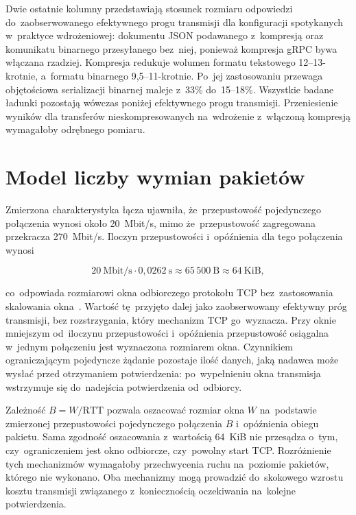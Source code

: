 Dwie ostatnie kolumny przedstawiają stosunek rozmiaru odpowiedzi do~zaobserwowanego efektywnego progu transmisji dla konfiguracji spotykanych w~praktyce wdrożeniowej: dokumentu JSON podawanego z~kompresją oraz komunikatu binarnego przesyłanego bez~niej, ponieważ kompresja gRPC bywa włączana rzadziej. Kompresja redukuje wolumen formatu tekstowego 12--13-krotnie, a~formatu binarnego 9,5--11-krotnie. Po~jej zastosowaniu przewaga objętościowa serializacji binarnej maleje z~33\% do~15--18\%. Wszystkie badane ładunki pozostają wówczas poniżej efektywnego progu transmisji. Przeniesienie wyników dla transferów nieskompresowanych na~wdrożenie z~włączoną kompresją wymagałoby odrębnego pomiaru.

\section{Model liczby wymian pakietów}
\label{sec:ModelOkna}

Zmierzona charakterystyka łącza ujawniła, że~przepustowość pojedynczego połączenia wynosi około 20~Mbit/s, mimo że~przepustowość zagregowana przekracza 270~Mbit/s. Iloczyn przepustowości i~opóźnienia dla tego połączenia wynosi

\begin{equation}
20~\mathrm{Mbit/s} \cdot 0{,}0262~\mathrm{s} \approx 65\,500~\mathrm{B} \approx 64~\mathrm{KiB},
\label{eq:BDP}
\end{equation}

co~odpowiada rozmiarowi okna odbiorczego protokołu TCP bez~zastosowania skalowania okna~\cite{bib:RFC9293}. Wartość tę~przyjęto dalej jako zaobserwowany efektywny próg transmisji, bez rozstrzygania, który mechanizm TCP go~wyznacza. Przy oknie mniejszym od~iloczynu przepustowości i~opóźnienia przepustowość osiągalna w~jednym połączeniu jest wyznaczona rozmiarem okna. Czynnikiem ograniczającym pojedyncze żądanie pozostaje ilość danych, jaką nadawca może wysłać przed otrzymaniem potwierdzenia: po~wypełnieniu okna transmisja wstrzymuje się do~nadejścia potwierdzenia od~odbiorcy.

Zależność $B = W / \mathrm{RTT}$ pozwala oszacować rozmiar okna $W$ na~podstawie zmierzonej przepustowości pojedynczego połączenia $B$ i~opóźnienia obiegu pakietu. Sama zgodność oszacowania z~wartością 64~KiB nie przesądza o~tym, czy~ograniczeniem jest okno odbiorcze, czy~powolny start TCP. Rozróżnienie tych mechanizmów wymagałoby przechwycenia ruchu na~poziomie pakietów, którego nie wykonano. Oba mechanizmy mogą prowadzić do~skokowego wzrostu kosztu transmisji związanego z~koniecznością oczekiwania na~kolejne potwierdzenia.

